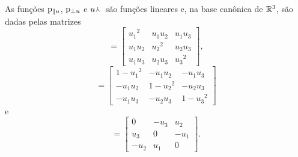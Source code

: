 




As funções $\mathrm{p}_{\parallel u}$, $\mathrm{p}_{\perp u}$ e ${u\!} \Yup {}$ são funções lineares e, na base canônica de $\mathbb{R}^3$, são dadas pelas matrizes
	\begin{equation*}
	[\proj_{\parallel u}] =
		\begin{bmatrix}
			{u_1}^2 & u_1u_2 & u_1u_3 \\
			u_1u_2 & {u_2}^2 & u_2u_3 \\
			u_1u_3 & u_2u_3 & {u_3}^2
		\end{bmatrix},
	\end{equation*}
	\begin{equation*}
	[\proj_{\perp u}] =
		\begin{bmatrix}
			1-{u_1}^2 & -u_1u_2 & -u_1u_3 \\
			-u_1u_2 & 1-{u_2}^2 & -u_2u_3 \\
			-u_1u_3 & -u_2u_3 & 1-{u_3}^2
		\end{bmatrix}
	\end{equation*}
e
	\begin{equation*}
	[\pvec{u\!}{}] =
		\begin{bmatrix}
			0 & -u_3 & u_2 \\
			u_3 & 0 & -u_1 \\
			-u_2 & u_1 & 0
		\end{bmatrix}.
	\end{equation*}

